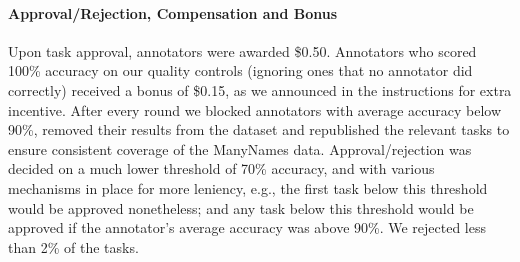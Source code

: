 \documentclass[11pt,a4paper]{article}
\newcommand{\mn}{ManyNames\xspace}
\begin{document}
\paragraph{Approval/Rejection, Compensation and Bonus}
Upon task approval, annotators were awarded \$0.50.
Annotators who scored 100\% accuracy on our quality controls (ignoring ones that no annotator did correctly) received a bonus of \$0.15, as we announced in the instructions for extra incentive.
After every round we blocked annotators with average accuracy below 90\%, removed their results from the dataset and republished the relevant tasks to ensure consistent coverage of the \mn data.
Approval/rejection was decided on a much lower threshold of 70\% accuracy, and with various mechanisms in place for more leniency, e.g., the first task below this threshold would be approved nonetheless; and any task below this threshold would be approved if the annotator's average accuracy was above 90\%.
We rejected less than 2\% of the tasks.



%
%
\end{document}
